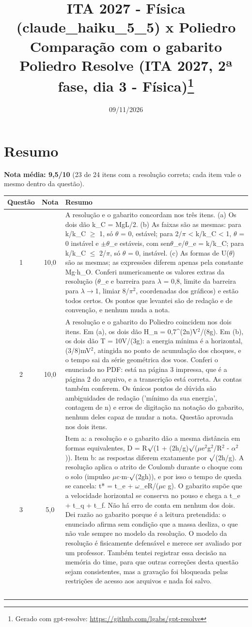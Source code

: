 \documentclass{article}%
\title{ITA 2027 {-} Física (claude\_haiku\_5\_5) x Poliedro\\[4pt]\large Comparação com o gabarito Poliedro Resolve (ITA 2027, 2ª fase, dia 3 {-} Física)\thanks{Gerado com gpt-resolve: \url{https://github.com/lgabs/gpt-resolve}}}%
\date{09/11/2026}%
\begin{document}
%
\normalsize%
\maketitle%
\section*{Resumo}\textbf{Nota média: 9,5/10} (23 de 24 itens com a resolução correta; cada item vale o mesmo dentro da questão).\par\medskip%
\begin{longtable}{@{}c c p{}@{}}\toprule Questão & Nota & Resumo \\ \midrule
1 & 10,0 & A resolução e o gabarito concordam nos três itens. (a) Os dois dão k\_C = MgL/2. (b) As faixas são as mesmas: para k/k\_C $\geq$ 1, só $\theta$ = 0, estável; para 2/$\pi$ < k/k\_C < 1, $\theta$ = 0 instável e $\pm$$\theta$\_e estáveis, com sen$\theta$\_e/$\theta$\_e = k/k\_C; para k/k\_C $\leq$ 2/$\pi$, só $\theta$ = 0, instável. (c) As formas de U($\theta$) são as mesmas; as expressões diferem apenas pela constante Mg$\cdot$h\_O. Conferi numericamente os valores extras da resolução ($\theta$\_e e barreira para $\lambda$ = 0,8, limite da barreira para $\lambda$$\to$1, limiar 8/$\pi$$^2$, coordenadas dos gráficos) e estão todos certos. Os pontos que levantei são de redação e de convenção, e nenhum muda a nota. \\
2 & 10,0 & A resolução e o gabarito do Poliedro coincidem nos dois itens. Em (a), os dois dão H\_n = 0,7\^{}(2n)V$^2$/(8g). Em (b), os dois dão T = 10V/(3g): a energia mínima é a horizontal, (3/8)mV$^2$, atingida no ponto de acumulação dos choques, e o tempo sai da série geométrica dos voos. Conferi o enunciado no PDF: está na página 3 impressa, que é a página 2 do arquivo, e a transcrição está correta. As contas também conferem. Os únicos pontos de dúvida são ambiguidades de redação ('mínimo da sua energia', contagem de n) e erros de digitação na notação do gabarito, nenhum deles capaz de mudar a nota. Questão aprovada nos dois itens. \\
3 & 5,0 & Item a: a resolução e o gabarito dão a mesma distância em formas equivalentes, D = R$\surd$(1 + (2h/g)$\surd$($\mu$e$^2$g$^2$/R$^2$ - $\alpha$$^2$)). Item b: as respostas diferem exatamente por $\surd$(2h/g). A resolução aplica o atrito de Coulomb durante o choque com o solo (impulso $\mu$c$\cdot$m$\cdot$$\surd$(2gh)), e por isso o tempo de queda se cancela: t* = t\_e + $\omega$\_eR/($\mu$c g). O gabarito supõe que a velocidade horizontal se conserva no pouso e chega a t\_e + t\_q + t\_f. Não há erro de conta em nenhum dos dois. Dei razão ao gabarito porque é a leitura pretendida: o enunciado afirma sem condição que a massa desliza, o que não vale sempre no modelo da resolução. O modelo da resolução é fisicamente defensável e merece ser avaliado por um professor. Também tentei registrar essa decisão na memória do time, para que outras correções desta questão sejam consistentes, mas a gravação foi bloqueada pelas restrições de acesso aos arquivos e nada foi salvo. \\
$$
\end{longtable}
\end{document}
